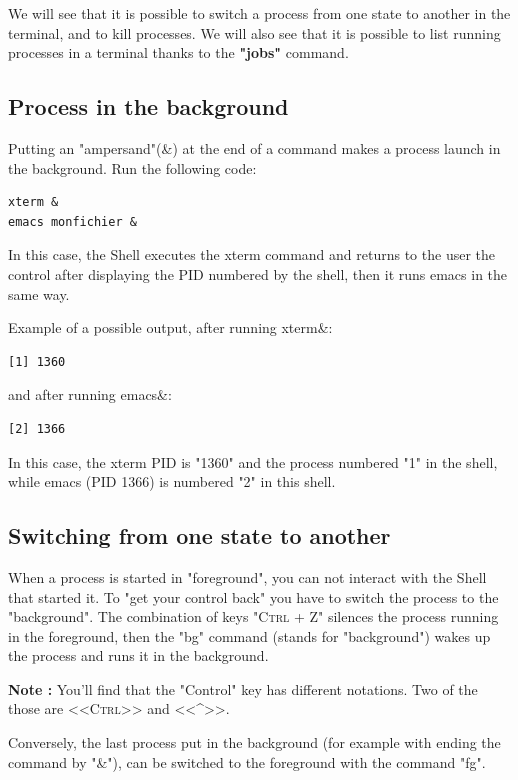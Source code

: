 \documentclass[11pt]{article}
\begin{document}
We will see that it is possible to switch a process from one state to another in the terminal, and to kill processes. We will also see that it is possible to list running processes in a terminal thanks to the \textbf{"jobs"} command.


\subsection{Process in the background}

Putting an "ampersand"(\&) at the end of a command makes a process launch in the background. Run the following code:

\begin{lstlisting}
xterm &
emacs monfichier &
\end{lstlisting}

In this case, the Shell executes the xterm command and returns to the user the control after displaying the PID numbered by the shell, then it runs  emacs in the same way.

Example of a possible output, after running xterm\&:

\begin{lstlisting}
[1] 1360
\end{lstlisting}

and after running emacs\&:

\begin{lstlisting}
[2] 1366
\end{lstlisting}
In this case, the xterm PID is "1360" and the process numbered "1" in the shell, while emacs (PID 1366) is numbered "2" in this shell.

\subsection{Switching from one state to another}

When a process is started in "foreground", you can not interact with the Shell that started it.
To "get your control back" you have to switch the process to the "background".
The combination of keys \textsc{"Ctrl + Z"} silences the process running in the foreground, then the "bg" command (stands for "background") wakes up the process and runs it in the background.

\textbf{Note :} You'll find that the "Control" key has different notations. Two of the those are <<\textsc{Ctrl}>> and <<\^{}>>.
\smallskip

Conversely, the last process put in the background (for example with ending the command by "\&"), can be switched to the foreground with the command "fg". 
\end{document}
